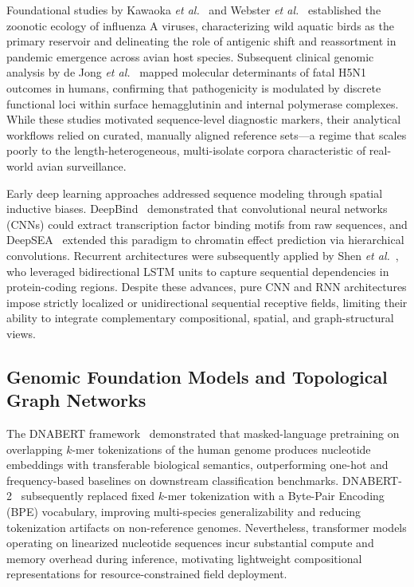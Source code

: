 \documentclass[conference]{IEEEtran}
\begin{document}
Foundational studies by Kawaoka \textit{et al.}~\cite{kawaoka1992} and Webster \textit{et al.}~\cite{webster1992} established the zoonotic ecology of influenza A viruses, characterizing wild aquatic birds as the primary reservoir and delineating the role of antigenic shift and reassortment in pandemic emergence across avian host species. Subsequent clinical genomic analysis by de Jong \textit{et al.}~\cite{dejong2006} mapped molecular determinants of fatal H5N1 outcomes in humans, confirming that pathogenicity is modulated by discrete functional loci within surface hemagglutinin and internal polymerase complexes. While these studies motivated sequence-level diagnostic markers, their analytical workflows relied on curated, manually aligned reference sets---a regime that scales poorly to the length-heterogeneous, multi-isolate corpora characteristic of real-world avian surveillance.

Early deep learning approaches addressed sequence modeling through spatial inductive biases. DeepBind~\cite{alipanahi2015} demonstrated that convolutional neural networks (CNNs) could extract transcription factor binding motifs from raw sequences, and DeepSEA~\cite{zhou2015} extended this paradigm to chromatin effect prediction via hierarchical convolutions. Recurrent architectures were subsequently applied by Shen \textit{et al.}~\cite{shen2018}, who leveraged bidirectional LSTM units to capture sequential dependencies in protein-coding regions. Despite these advances, pure CNN and RNN architectures impose strictly localized or unidirectional sequential receptive fields, limiting their ability to integrate complementary compositional, spatial, and graph-structural views.

\subsection{Genomic Foundation Models and Topological Graph Networks}

The DNABERT framework~\cite{ji2021} demonstrated that masked-language pretraining on overlapping $k$-mer tokenizations of the human genome produces nucleotide embeddings with transferable biological semantics, outperforming one-hot and frequency-based baselines on downstream classification benchmarks. DNABERT-2~\cite{zhou2024_dnabert2} subsequently replaced fixed $k$-mer tokenization with a Byte-Pair Encoding (BPE) vocabulary, improving multi-species generalizability and reducing tokenization artifacts on non-reference genomes. Nevertheless, transformer models operating on linearized nucleotide sequences incur substantial compute and memory overhead during inference, motivating lightweight compositional representations for resource-constrained field deployment.
\end{document}
